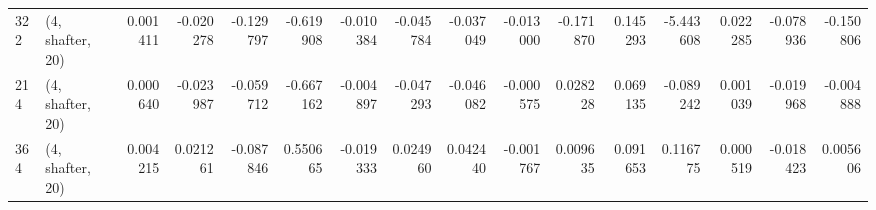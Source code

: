 \begin{tabular}{llrrrrrrrrrrrrrr}
322 &  (4, shafter, 20) &   0.001411 & -0.020278 & -0.129797 &   -0.619908 & -0.010384 &  -0.045784 & -0.037049 & -0.013000 & -0.171870 &  0.145293 &   -5.443608 &  0.022285 & -0.078936 & -0.150806 \\
214 &  (4, shafter, 20) &   0.000640 & -0.023987 & -0.059712 &   -0.667162 & -0.004897 &  -0.047293 & -0.046082 & -0.000575 &  0.028228 &  0.069135 &   -0.089242 &  0.001039 & -0.019968 & -0.004888 \\
364 &  (4, shafter, 20) &   0.004215 &  0.021261 & -0.087846 &    0.550665 & -0.019333 &   0.024960 &  0.042440 & -0.001767 &  0.009635 &  0.091653 &    0.116775 &  0.000519 & -0.018423 &  0.005606 \\
\bottomrule
\end{tabular}
